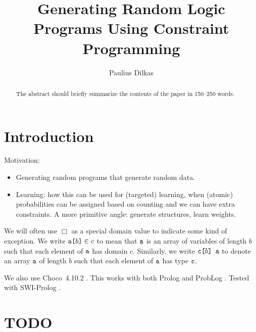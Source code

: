 \documentclass[runningheads]{llncs}
\newcommand{\variable}[1]{\texttt{\textup{#1}}}
\newcommand{\arrayd}[3]{\variable{{#1}[}{#2}\variable{]} \in {#3}}
\newcommand{\arrayt}[3]{\variable{{#3}[}{#2}\variable{] {#1}}}
\begin{document}
\title{Generating Random Logic Programs Using Constraint Programming}
\author{Paulius Dilkas}

\maketitle

\begin{abstract}
The abstract should briefly summarize the contents of the paper in
150--250 words.

\end{abstract}

\section{Introduction}

Motivation:
\begin{itemize}
\item Generating random programs that generate random data.
\item Learning: how this can be used for (targeted) learning, when (atomic)
  probabilities can be assigned based on counting and we can have extra
  constraints. A more primitive angle: generate structures, learn weights.
\end{itemize}

We will often use $\Box$ as a special domain value to indicate some kind of
exception. We write $\arrayd{a}{b}{c}$ to mean that
$\variable{a}$ is an array of variables of length $b$ such that each element of
$\variable{a}$ has domain $c$. Similarly, we write $\arrayt{a}{b}{c}$ to denote
an array $\variable{a}$ of length $b$ such that each element of $\variable{a}$
has type $\variable{c}$.

We also use Choco~4.10.2 \cite{choco}. This works with both Prolog
\cite{DBLP:books/daglib/0041598} and ProbLog \cite{DBLP:conf/ijcai/RaedtKT07}.
Tested with SWI-Prolog \cite{DBLP:journals/tplp/WielemakerSTL12}.

\section{TODO}
\end{document}
